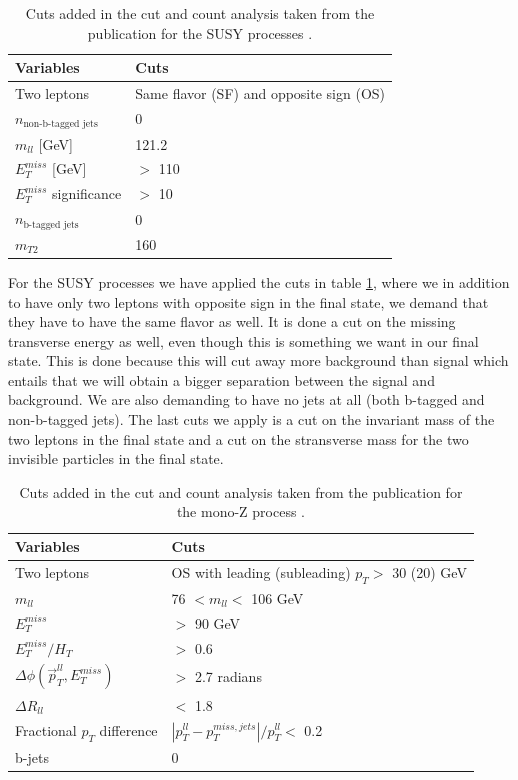 \begin{table}[H]
    \centering
    \begin{tabular}{l l}\toprule
    \textbf{Variables} & \textbf{Cuts}\\
    \midrule
    \midrule
    Two leptons & Same flavor (SF) and opposite sign (OS)\\
    $n_{\text{non-b-tagged jets}}$     & 0 \\
    $m_{ll}$ [GeV]     & 121.2\\
    $E_T^{miss}$ [GeV] & $>$ 110 \\
    $E_T^{miss}$ significance & $>$ 10\\
    $n_{\text{b-tagged jets}}$ & 0\\
    $m_{T2}$ & 160\\
    \bottomrule
    \end{tabular}
    \caption{Cuts added in the cut and count analysis taken from the publication for the SUSY processes \cite{sleptonexclusion}.}
    \label{tab:cutsSUSY}
\end{table}

For the SUSY processes we have applied the cuts in table \ref{tab:cutsSUSY}, where we in addition to have only two leptons with opposite sign in the final state, we demand that they have to have the same flavor as well. It is done a cut on the missing transverse energy as well, even though this is something we want in our final state. This is done because this will cut away more background than signal which entails that we will obtain a bigger separation between the signal and background. We are also demanding to have no jets at all (both b-tagged and non-b-tagged jets). The last cuts we apply is a cut on the invariant mass of the two leptons in the final state and a cut on the stransverse mass for the two invisible particles in the final state. 

\begin{table}[H]
    \centering
    \begin{tabular}{l l}\toprule
    \textbf{Variables} & \textbf{Cuts}\\
    \midrule
    \midrule
    Two leptons     &  OS with leading (subleading) $p_T >$ 30 (20) GeV\\
    $m_{ll}$     & 76 $< m_{ll} <$ 106 GeV\\
    $E_T^{miss}$ & $>$ 90 GeV\\
    $E_T^{miss}/H_T$ & $>$ 0.6\\
    $\Delta \phi (\Vec{p}_T^{ll}, E_T^{miss})$ & $>$ 2.7 radians\\
    $\Delta R_{ll}$ & $<$ 1.8\\
    Fractional $p_T$ difference & $|p_T^{ll} - p_T^{miss, jets}|/p_T^{ll} <$ 0.2\\
    b-jets & 0\\
    \bottomrule
     \end{tabular}
    \caption{Cuts added in the cut and count analysis taken from the publication for the mono-Z process \cite{monoZexclusion}.}
    \label{tab:cutsDM}
\end{table}

